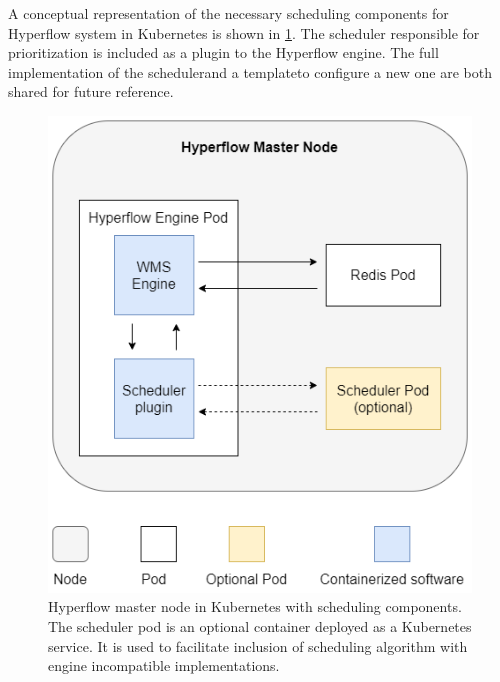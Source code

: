 A conceptual representation of the necessary scheduling components for Hyperflow system in Kubernetes is shown in \cref{fig:solution:k8s-plugin-arch}.
The scheduler responsible for prioritization is included as a plugin to the Hyperflow engine.
The full implementation of the scheduler\footnotemark[1] and a template\footnotemark[2] to configure a new one are both shared for future reference.



\begin{figure}[H]
\centering
\includegraphics[width=0.5\linewidth]{figures/4-1-HflowPluginArch.png}
\caption[Concept of scheduling in Hyperflow]{Hyperflow master node in Kubernetes with scheduling components. The scheduler pod is an optional container deployed as a Kubernetes service. It is used to facilitate inclusion of scheduling algorithm with engine incompatible implementations.}


\label{fig:solution:k8s-plugin-arch}
\end{figure}
\clearpage


